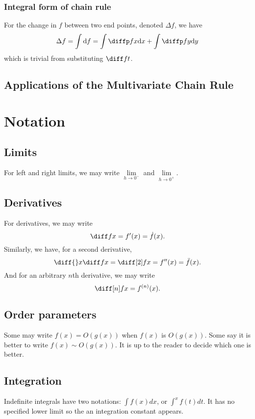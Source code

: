 \documentclass[12pt]{article}
\begin{document}
\subsubsection*{Integral form of chain rule}

For the change in $f$ between two end points, denoted $\Delta f$, we have
\[
    \Delta f = \int \di f = \int \diffp fx \di x + \int \diffp fy \di y
\]
which is trivial from substituting $\diff ft$.

\subsection{Applications of the Multivariate Chain Rule}


\appendix

\newpage
\section{Notation}

\subsection{Limits}

For left and right limits, we may write $\lim\limits_{h \to 0^{-}}$ and $\lim\limits_{h \to 0^{+}}.$ 

\subsection{Derivatives}

For derivatives, we may write
\[
    \diff f x = f'(x) = \dot f(x).
\]
Similarly, we have, for a second derivative,
\[
    \diff {}x \diff f x = \diff[2] f x = f''(x) = \ddot f(x).
\]
And for an arbitrary $n$th derivative, we may write
\[
    \diff[n] f x = f^{(n)}(x).
\]

\subsection{Order parameters}

Some may write $f(x) = O(g(x))$ when $f(x)$ is $O(g(x))$.
Some say it is better to write $f(x) \sim O(g(x))$.
It is up to the reader to decide which one is better.

\subsection{Integration}

Indefinite integrals have two notations: $\int f(x)dx$, or $\int^x f(t)dt$.
It has no specified lower limit so the an integration constant appears.
\end{document}
